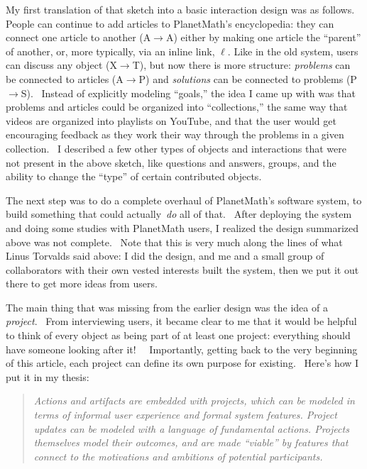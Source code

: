 My first translation of that sketch into a basic interaction design
was as follows.~ People can continue to add articles to PlanetMath's
encyclopedia: they can connect one article to another
(A$\rightarrow$A) either by making one article the ``parent'' of
another, or, more typically, via an inline link, $\ell$. Like in the
old system, users can discuss any object (X$\rightarrow$T), but now
there is more structure: \emph{problems} can be connected to articles
(A$\rightarrow$P) and \emph{solutions} can be connected to problems
(P$\rightarrow$S).~ Instead of explicitly modeling ``goals,'' the idea I
came up with was that problems and articles could be organized into
``collections,'' the same way that videos are organized into playlists
on YouTube, and that the user would get encouraging feedback as they
work their way through the problems in a given collection.~ I
described a few other types of objects and interactions that were not
present in the above sketch, like questions and answers, groups, and
the ability to change the ``type'' of certain contributed objects.~

The next step was to do a complete overhaul of PlanetMath's software
system, to build something that could actually~\emph{do} all of that.~
After deploying the system and doing some studies with PlanetMath
users, I realized the design summarized above was not complete.~ Note
that this is very much along the lines of what Linus Torvalds said
above: I did the design, and me and a small group of collaborators
with their own vested interests built the system, then we put it out
there to get more ideas from users.

The main thing that was missing from the earlier design was the idea
of a \emph{project}.~ From interviewing users, it became clear to me
that it would be helpful to think of every object as being part of at
least one project: everything should have someone looking after it!~~
Importantly, getting back to the very beginning of this article, each
project can define its own purpose for existing.~ Here's how I put it
in my thesis:

\begin{quote}
\emph{Actions and artifacts are embedded with projects, which can be
modeled in terms of informal user experience and formal system features.
Project updates can be modeled with a language of fundamental actions.
Projects themselves model their outcomes, and are made ``viable'' by
features that connect to the motivations and ambitions of potential
participants.}
\end{quote}


